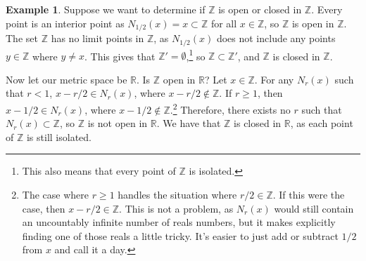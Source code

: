 \documentclass{article}
\newcommand{\R}{\mathbb{R}}
\newcommand{\Z}{\mathbb{Z}}
\theoremstyle{definition}
\newtheorem{example}{Example}[section]
\begin{document}
\begin{example}
	Suppose we want to determine if $ \Z $ is open or closed in $ \Z $. Every point is an interior point as $ N_{1/2}(x)={x}\subset\Z $ for all $ x\in\Z $, so $ \Z $ is open in $ \Z $. The set $ \Z $ has no limit points in $ \Z $, as $ N_{1/2}(x) $ does not include any points $ y\in\Z $ where $ y\neq x $. This gives that $ \Z'=\emptyset $,\footnote{This also means that every point of $ \Z $ is isolated.} so $ \Z\subset \Z' $, and $ \Z $ is closed in $ \Z $.
	
	 Now let our metric space be $ \R $. Is $ \Z $ open in $ \R $? Let $ x\in\Z $. For any $ N_r(x) $ such that $ r<1 $, $ x-r/2\in N_r(x) $, where $ x-r/2\notin\Z $. If $ r\ge 1 $, then $ x-1/2\in N_r(x) $, where $ x-1/2\notin\Z $.\footnote{The case where $ r\ge 1 $ handles the situation where $ r/2\in\Z $. If this were the case, then $ x-r/2\in\Z $. This is not a problem, as $ N_r(x) $ would still contain an uncountably infinite number of reals numbers, but it makes explicitly finding one of those reals a little tricky. It's easier to just add or subtract $ 1/2 $ from $ x $ and call it a day.} Therefore, there exists no $ r $ such that $ N_r(x)\subset \Z $, so $ \Z $ is not open in $ \R $. We have that $ \Z $ is closed in $ \R $, as each point of $ \Z $ is still isolated.  
\end{example}
\end{document}
